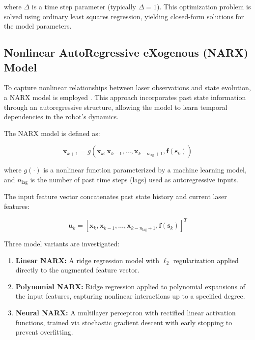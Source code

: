 \documentclass[conference]{IEEEtran}
\begin{document}
where $\Delta$ is a time step parameter (typically $\Delta = 1$). This optimization problem is solved using ordinary least squares regression, yielding closed-form solutions for the model parameters.

\subsection{Nonlinear AutoRegressive eXogenous (NARX) Model} \label{sec:laser_model_narx}

To capture nonlinear relationships between laser observations and state evolution, a NARX model is employed \cite{scikit-learn}. This approach incorporates past state information through an autoregressive structure, allowing the model to learn temporal dependencies in the robot's dynamics.

The NARX model is defined as:

\begin{equation}
    \mathbf{x}_{k+1} = g(\mathbf{x}_k, \mathbf{x}_{k-1}, \ldots, \mathbf{x}_{k-n_{\text{lag}}+1}, \mathbf{f}(\mathbf{s}_k))
\end{equation}

where $g(\cdot)$ is a nonlinear function parameterized by a machine learning model, and $n_{\text{lag}}$ is the number of past time steps (lags) used as autoregressive inputs.

The input feature vector concatenates past state history and current laser features:

\begin{equation}
    \mathbf{u}_k = [\mathbf{x}_k, \mathbf{x}_{k-1}, \ldots, \mathbf{x}_{k-n_{\text{lag}}+1}, \mathbf{f}(\mathbf{s}_k)]^T
\end{equation}

Three model variants are investigated:

\begin{enumerate}
    \item \textbf{Linear NARX:} A ridge regression model with $\ell_2$ regularization applied directly to the augmented feature vector.
    
    \item \textbf{Polynomial NARX:} Ridge regression applied to polynomial expansions of the input features, capturing nonlinear interactions up to a specified degree.
    
    \item \textbf{Neural NARX:} A multilayer perceptron with rectified linear activation functions, trained via stochastic gradient descent with early stopping to prevent overfitting.
\end{enumerate}
\end{document}
